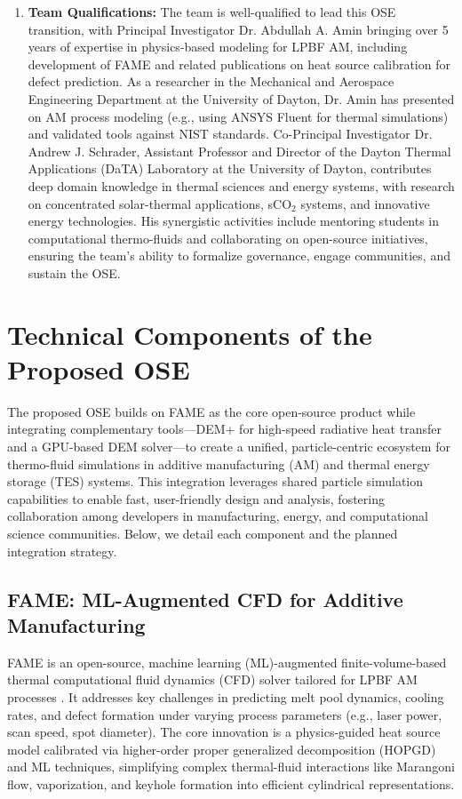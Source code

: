 \documentclass[11pt]{article}
\begin{document}
\begin{enumerate}
    \vspace{-3pt}
    \item \textbf{Team Qualifications:} The team is well-qualified to lead this OSE transition, with Principal Investigator Dr. Abdullah A. Amin bringing over 5 years of expertise in physics-based modeling for LPBF AM, including development of FAME and related publications on heat source calibration for defect prediction. As a researcher in the Mechanical and Aerospace Engineering Department at the University of Dayton, Dr. Amin has presented on AM process modeling (e.g., using ANSYS Fluent for thermal simulations) and validated tools against NIST standards. Co-Principal Investigator Dr. Andrew J. Schrader, Assistant Professor and Director of the Dayton Thermal Applications (DaTA) Laboratory at the University of Dayton, contributes deep domain knowledge in thermal sciences and energy systems, with research on concentrated solar-thermal applications, sCO$_2$ systems, and innovative energy technologies. His synergistic activities include mentoring students in computational thermo-fluids and collaborating on open-source initiatives, ensuring the team's ability to formalize governance, engage communities, and sustain the OSE.
\end{enumerate}
\vspace{-3pt}
\section*{Technical Components of the Proposed OSE}
\vspace{-3pt}
\noindent
The proposed OSE builds on FAME as the core open-source product while integrating complementary tools—DEM+ for high-speed radiative heat transfer and a GPU-based DEM solver—to create a unified, particle-centric ecosystem for thermo-fluid simulations in additive manufacturing (AM) and thermal energy storage (TES) systems. This integration leverages shared particle simulation capabilities to enable fast, user-friendly design and analysis, fostering collaboration among developers in manufacturing, energy, and computational science communities. Below, we detail each component and the planned integration strategy.

\subsection*{FAME: ML-Augmented CFD for Additive Manufacturing}
\noindent
FAME is an open-source, machine learning (ML)-augmented finite-volume-based thermal computational fluid dynamics (CFD) solver tailored for LPBF AM processes \cite{aminPhysicsGuidedHeat2024}. It addresses key challenges in predicting melt pool dynamics, cooling rates, and defect formation under varying process parameters (e.g., laser power, scan speed, spot diameter). The core innovation is a physics-guided heat source model calibrated via higher-order proper generalized decomposition (HOPGD) and ML techniques, simplifying complex thermal-fluid interactions like Marangoni flow, vaporization, and keyhole formation into efficient cylindrical representations.
\end{document}

